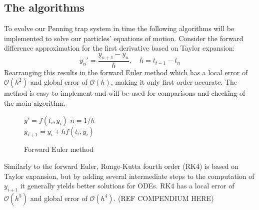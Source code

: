 \documentclass[english,notitlepage,reprint,nofootinbib]{revtex4-1}  %
\begin{document}
\subsection*{The algorithms}
To evolve our Penning trap system in time the following algorithms will be implemented to solve our particles' equations of motion.
Consider the forward difference approximation for the first derivative based on Taylor expansion:
\begin{equation}
    y_n' = \frac{y_{n+1}  - y_n}{h}, \quad h = t_{t-1} -t_n
\end{equation}
Rearranging this results in the forward Euler method which has a local error of $\mathcal{O}(h^2)$ and global error of $\mathcal{O}(h)$,
making it only first order accurate. The method is easy to implement and will be used for comparisons
and checking of the main algorithm.
%
\begin{figure}[H]
    \begin{algorithm}[H]
        \caption{Forward Euler method}
        \label{algo:EUL}
        \begin{algorithmic}
            \State $y' = f(t_i,y_i)$        
            \State $n = 1 / h$ 
            \\
            \State $y_{i+1} = y_i + h f(t_i, y_i)$  
            \EndFor
            \EndProcedure
        \end{algorithmic}
    \end{algorithm}
\end{figure}

Similarly to the forward Euler, Runge-Kutta fourth order (RK4) is based on Taylor expansion, but by adding several intermediate
steps to the computation of $y_{i+1}$ it generally yields better solutions for ODEs. RK4 has a local error of $\mathcal{O}(h^5)$
and global error of $\mathcal{O}(h^4)$. (REF COMPENDIUM HERE)
\end{document}
